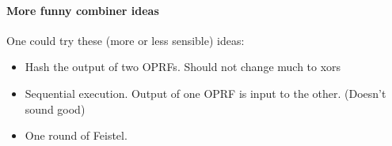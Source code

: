 \paragraph{More funny combiner ideas}
One could try these (more or less sensible) ideas:
\begin{itemize}
    \item Hash the output of two OPRFs. Should not change much to xors
    \item Sequential execution. Output of one OPRF is input to the other. (Doesn't sound good)
    \item One round of Feistel.
\end{itemize}